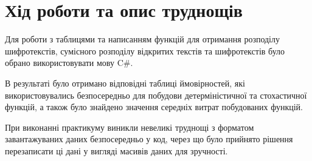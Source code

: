 \section{Хід роботи та опис труднощів}

Для роботи з таблицями та написанням функцій для отримання розподілу шифротекстів, сумісного розподілу відкритих текстів та шифротекстів було обрано використовувати мову C\#.

В результаті було отримано відповідні таблиці ймовірностей, які використовувались безпосередньо для побудови детерміністичної та стохастичної функцій, а також було знайдено значення середніх витрат побудованих функцій.

При виконанні практикуму виникли невеликі труднощі з форматом завантажуваних даних безпосередньо у код, через що було прийнято рішення перезаписати ці дані у вигляді масивів даних для зручності.